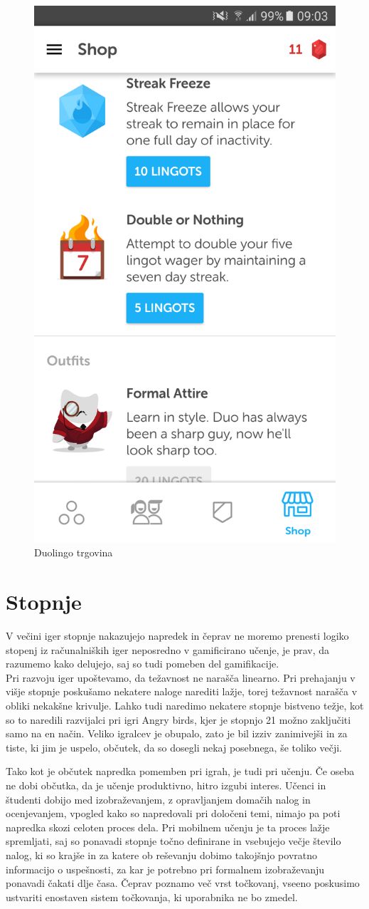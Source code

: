 \documentclass[a4paper, 12pt]{book}
\begin{document}
\begin{figure}[H]
\centering
\includegraphics[height=0.8\textwidth]{slike/lingo}
\caption{Duolingo trgovina}\label{duolingo2}
\end{figure}

\section{Stopnje}
V večini iger stopnje nakazujejo napredek in čeprav ne moremo prenesti logiko stopenj iz računalniških iger neposredno v gamificirano učenje, je prav, da razumemo kako delujejo, saj so tudi pomeben del gamifikacije.\\Pri razvoju iger upoštevamo, da težavnost ne narašča linearno. Pri prehajanju v višje stopnje poskušamo nekatere naloge narediti lažje, torej težavnost narašča v obliki nekakšne krivulje. Lahko tudi naredimo nekatere stopnje bistveno težje, kot so to naredili razvijalci pri igri Angry birds, kjer je stopnjo 21 možno zaključiti samo na en način. Veliko igralcev je obupalo, zato je bil izziv zanimivejši in za tiste, ki jim je uspelo, občutek, da so dosegli nekaj posebnega, še toliko večji.

Tako kot je občutek napredka pomemben pri igrah, je tudi pri učenju. Če oseba ne dobi občutka, da je učenje produktivno, hitro izgubi interes. Učenci in študenti dobijo med izobraževanjem, z opravljanjem domačih nalog in ocenjevanjem, vpogled kako so napredovali pri določeni temi, nimajo pa poti napredka skozi celoten proces dela. Pri mobilnem učenju je ta proces lažje spremljati, saj so ponavadi stopnje točno definirane in vsebujejo večje število nalog, ki so krajše in za katere ob reševanju dobimo takojšnjo povratno informacijo o uspešnosti, za kar je potrebno pri formalnem izobraževanju ponavadi čakati dlje časa. Čeprav poznamo več vrst točkovanj, vseeno poskusimo ustvariti enostaven sistem točkovanja, ki uporabnika ne bo zmedel.
\end{document}
